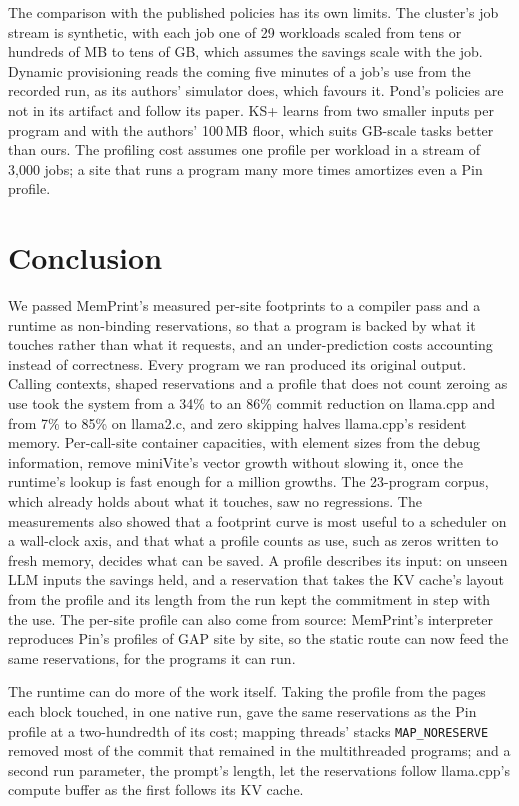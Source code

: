 \documentclass[11pt]{article}
\newcommand{\memprint}{MemPrint}
\begin{document}
The comparison with the published policies has its own limits. The cluster's job stream is synthetic, with each
job one of 29 workloads scaled from tens or hundreds of MB to tens of GB, which assumes the savings scale with the
job. Dynamic provisioning reads the coming five minutes of a job's use from the recorded run, as its authors'
simulator does, which favours it. Pond's policies are not in its artifact and follow its paper. KS+ learns from two
smaller inputs per program and with the authors' 100\,MB floor, which suits GB-scale tasks better than ours. The
profiling cost assumes one profile per workload in a stream of 3{,}000 jobs; a site that runs a program many more
times amortizes even a Pin profile.

\section{Conclusion}
\label{sec:conclusion}

We passed \memprint{}'s measured per-site footprints to a compiler pass and a runtime as non-binding
reservations, so that a program is backed by what it touches rather than what it requests, and an
under-prediction costs accounting instead of correctness. Every program we ran produced its original output.
Calling contexts, shaped reservations and a profile that does not count zeroing as use took the system from a
34\% to an 86\% commit reduction on llama.cpp and from 7\% to 85\% on llama2.c, and zero skipping halves
llama.cpp's resident memory. Per-call-site container capacities, with element sizes from the debug information,
remove miniVite's vector growth without slowing it, once the runtime's lookup is fast enough for a million
growths. The 23-program corpus, which already holds about what it touches, saw no regressions. The measurements
also showed that a footprint curve is most useful to a scheduler on a wall-clock axis, and that what a profile
counts as use, such as zeros written to fresh memory, decides what can be saved. A profile describes its input:
on unseen LLM inputs the savings held, and a reservation that takes the KV cache's layout from the profile and its
length from the run kept the commitment in step with the use. The per-site profile can also come from source:
\memprint{}'s interpreter reproduces Pin's profiles of GAP site by site, so the static route can now feed the
same reservations, for the programs it can run.

The runtime can do more of the work itself. Taking the profile from the pages each block touched, in one native run,
gave the same reservations as the Pin profile at a two-hundredth of its cost; mapping threads' stacks
\texttt{MAP\_NORESERVE} removed most of the commit that remained in the multithreaded programs; and a second run
parameter, the prompt's length, let the reservations follow llama.cpp's compute buffer as the first follows its KV
cache.
\end{document}
